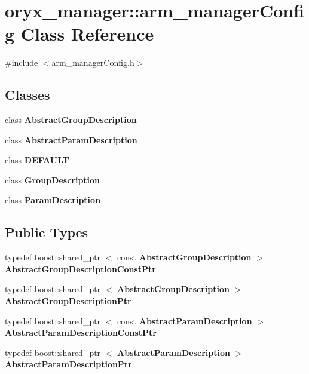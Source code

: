 \section{oryx\-\_\-manager\-:\-:arm\-\_\-manager\-Config \-Class \-Reference}
\label{classoryx__manager_1_1arm__managerConfig}


{\ttfamily \#include $<$arm\-\_\-manager\-Config.\-h$>$}

\subsection*{\-Classes}
\begin{DoxyCompactItemize}
\item 
class {\bf \-Abstract\-Group\-Description}
\item 
class {\bf \-Abstract\-Param\-Description}
\item 
class {\bf \-D\-E\-F\-A\-U\-L\-T}
\item 
class {\bf \-Group\-Description}
\item 
class {\bf \-Param\-Description}
\end{DoxyCompactItemize}
\subsection*{\-Public \-Types}
\begin{DoxyCompactItemize}
\item 
typedef boost\-::shared\-\_\-ptr\*
$<$ const \*
{\bf \-Abstract\-Group\-Description} $>$ {\bf \-Abstract\-Group\-Description\-Const\-Ptr}
\item 
typedef boost\-::shared\-\_\-ptr\*
$<$ {\bf \-Abstract\-Group\-Description} $>$ {\bf \-Abstract\-Group\-Description\-Ptr}
\item 
typedef boost\-::shared\-\_\-ptr\*
$<$ const \*
{\bf \-Abstract\-Param\-Description} $>$ {\bf \-Abstract\-Param\-Description\-Const\-Ptr}
\item 
typedef boost\-::shared\-\_\-ptr\*
$<$ {\bf \-Abstract\-Param\-Description} $>$ {\bf \-Abstract\-Param\-Description\-Ptr}
\end{DoxyCompactItemize}
